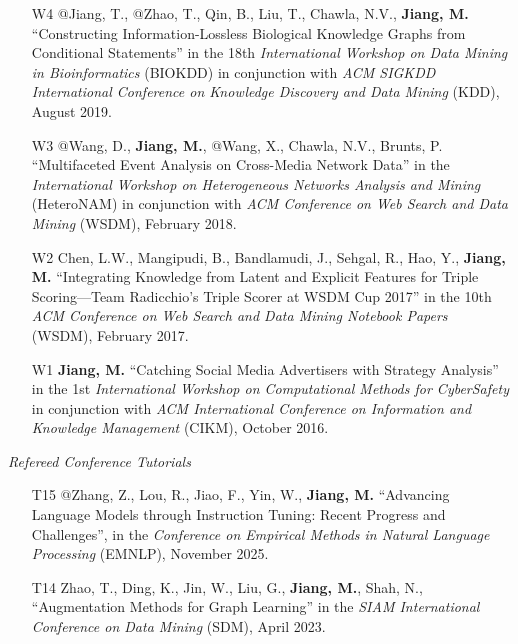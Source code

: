 \documentclass[10pt]{article}
\newenvironment{myindentpar}[1]%
{\begin{list}{}%
         {\setlength{\leftmargin}{#1}}%
         \item[]%
}
{\end{list}}
\newcounter{list}
\begin{document}
\begin{myindentpar}{0.00cm}
\begin{enumerate}[leftmargin=.5cm]
\item[W4] @Jiang, T., @Zhao, T., Qin, B., Liu, T., Chawla, N.V., \textbf{Jiang, M.} ``Constructing Information-Lossless Biological Knowledge Graphs from Conditional Statements'' in the 18th \textit{International Workshop on Data Mining in Bioinformatics} (BIOKDD) in conjunction with \textit{ACM SIGKDD International Conference on Knowledge Discovery and Data Mining} (KDD), August 2019.

\item[W3] @Wang, D., \textbf{Jiang, M.}, @Wang, X., Chawla, N.V., Brunts, P. ``Multifaceted Event Analysis on Cross-Media Network Data'' in the \textit{International Workshop on Heterogeneous Networks Analysis and Mining} (HeteroNAM) in conjunction with \textit{ACM Conference on Web Search and Data Mining} (WSDM), February 2018.

\item[W2] Chen, L.W., Mangipudi, B., Bandlamudi, J., Sehgal, R., Hao, Y., \textbf{Jiang, M.} ``Integrating Knowledge from Latent and Explicit Features for Triple Scoring—Team Radicchio's Triple Scorer at WSDM Cup 2017'' in the 10th \textit{ACM Conference on Web Search and Data Mining Notebook Papers} (WSDM), February 2017.

\item[W1] \textbf{Jiang, M.} ``Catching Social Media Advertisers with Strategy Analysis'' in the 1st \textit{International Workshop on Computational Methods for CyberSafety} in conjunction with \textit{ACM International Conference on Information and Knowledge Management} (CIKM), October 2016.

\end{enumerate}

\hspace{-0.25cm}\textit{Refereed Conference Tutorials}

\begin{enumerate}[leftmargin=.5cm]

\item[T15] @Zhang, Z., Lou, R., Jiao, F., Yin, W., \textbf{Jiang, M.} ``Advancing Language Models through Instruction Tuning: Recent Progress and Challenges'', in the \textit{Conference on Empirical Methods in Natural Language Processing} (EMNLP), November 2025.
		
\item[T14] Zhao, T., Ding, K., Jin, W., Liu, G., \textbf{Jiang, M.}, Shah, N., ``Augmentation Methods for Graph Learning'' in the \textit{SIAM International Conference on Data Mining} (SDM), April 2023.
		

\end{enumerate}
\end{myindentpar}
\end{document}
